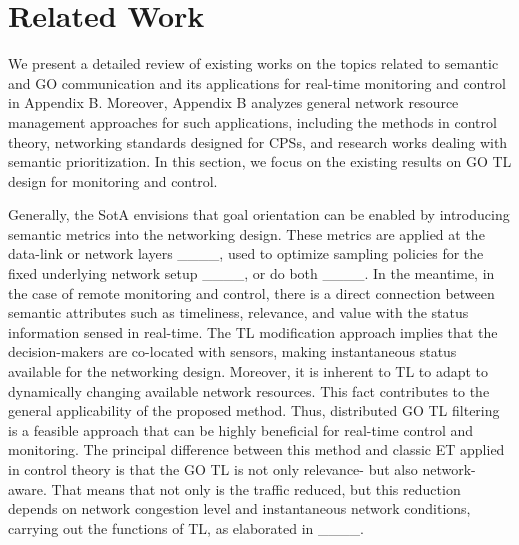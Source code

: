 \section{Related Work}
\label{sec:related_work}
We present a detailed review of existing works on the topics related to semantic and GO communication and its applications for real-time monitoring and control in Appendix B. Moreover, Appendix B analyzes general network resource management approaches for such applications, including the methods in control theory, networking standards designed for CPSs, and research works dealing with semantic prioritization. In this section, we focus on the existing results on GO TL design for monitoring and control.


Generally, the SotA envisions that goal orientation can be enabled by introducing semantic metrics into the networking design. These metrics are applied at the data-link or network layers ____, used to optimize sampling policies for the fixed underlying network setup ____, or do both ____. In the meantime, in the case of remote monitoring and control, there is a direct connection between semantic attributes such as timeliness, relevance, and value with the status information sensed in real-time. The TL modification approach implies that the decision-makers are co-located with sensors, making instantaneous status available for the networking design. Moreover, it is inherent to TL to adapt to dynamically changing available network resources. This fact contributes to the general applicability of the proposed method. Thus, distributed GO TL filtering is a feasible approach that can be highly beneficial for real-time control and monitoring.  The principal difference between this method and classic ET applied in control theory is that the GO TL is not only relevance- but also network-aware. That means that not only is the traffic reduced, but this reduction depends on network congestion level and instantaneous network conditions, carrying out the functions of TL, as elaborated in ____. 
 
